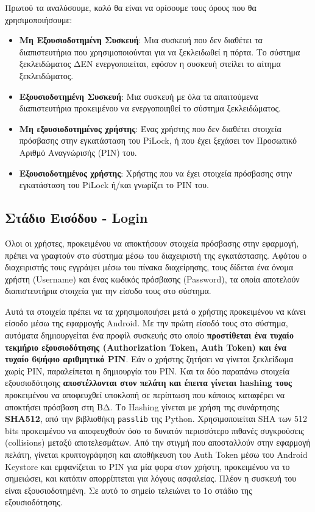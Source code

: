 	Πρωτού τα αναλύσουμε, καλό θα είναι να ορίσουμε τους όρους που θα χρησιμοποιήσουμε:
	\begin{itemize}
		\item \textbf{Μη Εξουσιοδοτημένη Συσκευή}: Μια συσκευή που δεν διαθέτει τα διαπιστευτήρια που χρησιμοποιούνται για να ξεκλειδωθεί η πόρτα. Το σύστημα ξεκλειδώματος ΔΕΝ ενεργοποιείται, εφόσον η συσκευή στείλει το αίτημα ξεκλειδώματος.
		\item \textbf{Εξουσιοδοτημένη Συσκευή}: Μια συσκευή με όλα τα απαιτούμενα διαπιστευτήρια προκειμένου να ενεργοποιηθεί το σύστημα ξεκλειδώματος.
		\item \textbf{Μη εξουσιοδοτημένος χρήστης}: Ένας χρήστης που δεν διαθέτει στοιχεία πρόσβασης στην εγκατάσταση του PiLock, ή που έχει ξεχάσει τον Προσωπικό Αριθμό Αναγνώρισής (PIN) του.
		\item \textbf{Εξουσιοδοτημένος χρήστης}: Χρήστης που να έχει στοιχεία πρόσβασης στην εγκατάσταση του PiLock ή/και γνωρίζει το PIN του.
	\end{itemize}

	\subsection{Στάδιο Εισόδου - Login}
		Όλοι οι χρήστες, προκειμένου να αποκτήσουν στοιχεία πρόσβασης στην εφαρμογή, πρέπει να γραφτούν στο σύστημα μέσω του διαχειριστή της εγκατάστασης. Αφότου ο διαχειριστής τους εγγράψει μέσω του πίνακα διαχείρησης, τους δίδεται ένα όνομα χρήστη (Username) και ένας κωδικός πρόσβασης (Password), τα οποία αποτελούν διαπιστευτήρια στοιχεία για την είσοδο τους στο σύστημα.

		Αυτά τα στοιχεία πρέπει να τα χρησιμοποιήσει μετά ο χρήστης προκειμένου να κάνει είσοδο μέσω της εφαρμογής Android. Με την πρώτη είσοδό τους στο σύστημα, αυτόματα δημιουργείται ένα προφίλ συσκευής στο οποίο \textbf{προστίθεται ένα τυχαίο τεκμήριο εξουσιοδότησης (Authorization Token, Auth Token) και ένα τυχαίο 6ψήφιο αριθμητικό PIN}. Εάν ο χρήστης ζητήσει να γίνεται ξεκλείδωμα χωρίς PIN, παραλείπεται η δημιουργία του PIN. Και τα δύο παραπάνω στοιχεία εξουσιοδότησης \textbf{αποστέλλονται στον πελάτη και έπειτα γίνεται hashing τους} προκειμένου να αποφευχθεί υποκλοπή σε περίπτωση που κάποιος καταφέρει να αποκτήσει πρόσβαση στη ΒΔ. Το Hashing γίνεται με χρήση της συνάρτησης \textbf{SHA512}, από την βιβλιοθήκη \verb|passlib| της Python. Χρησιμοποιείται SHA των 512 bits προκειμένου να αποφευχθούν όσο το δυνατόν περισσότερο πιθανές συγκρούσεις (collisions) μεταξύ αποτελεσμάτων. Από την στιγμή που αποσταλλούν στην εφαρμογή πελάτη, γίνεται κρυπτογράφηση και αποθήκευση του Auth Token μέσω του Android Keystore και εμφανίζεται το PIN για μία φορα στον χρήστη, προκειμένου να το σημειώσει, και κατόπιν απορρίπτεται για λόγους ασφαλείας. Πλέον η συσκευή του είναι εξουσιοδοτημένη. Σε αυτό το σημείο τελειώνει το 1ο στάδιο της εξουσιοδότησης.


